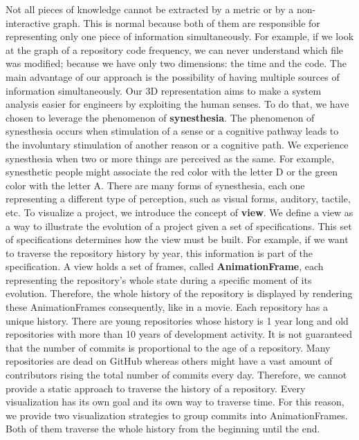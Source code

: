 Not all pieces of knowledge cannot be extracted by a metric or by a non-interactive graph. This is normal because both of them are responsible for representing only one piece of information simultaneously. For example, if we look at the graph of a repository code frequency, we can never understand which file was modified; because we have only two dimensions: the time and the code. The main advantage of our approach is the possibility of having multiple sources of information simultaneously. Our 3D representation aims to make a system analysis easier for engineers by exploiting the human senses.
To do that, we have chosen to leverage the phenomenon of \textbf{synesthesia}. The phenomenon of synesthesia occurs when stimulation of a sense or a cognitive pathway leads to the involuntary stimulation of another reason or a cognitive path. We experience synesthesia when two or more things are perceived as the same. 
For example, synesthetic people might associate the red color with the letter D or the green color with the letter A. 
There are many forms of synesthesia, each one representing a different type of perception, such as visual forms, auditory, tactile, etc.
\bigbreak
To visualize a project, we introduce the concept of \textbf{view}. We define a view as a way to illustrate the evolution of a project given a set of specifications. This set of specifications determines how the view must be built. For example, if we want to traverse the repository history by year, this information is part of the specification. A view holds a set of frames, called \textbf{AnimationFrame}, each representing the repository's whole state during a specific moment of its evolution. Therefore, the whole history of the repository is displayed by rendering these AnimationFrames consequently, like in a movie. 
\bigbreak
Each repository has a unique history. There are young repositories whose history is 1 year long and old repositories with more than 10 years of development activity. It is not guaranteed that the number of commits is proportional to the age of a repository. Many repositories are dead on GitHub whereas others might have a vast amount of contributors rising the total number of commits every day. Therefore, we cannot provide a static approach to traverse the history of a repository. 
Every visualization has its own goal and its own way to traverse time. For this reason, we provide two visualization strategies to group commits into AnimationFrames. Both of them traverse the whole history from the beginning until the end.
